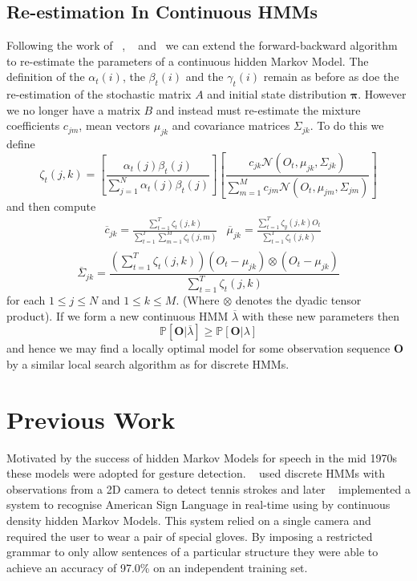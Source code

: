 \subsection{Re-estimation In Continuous HMMs}
Following the work of ~\citet{liporace1982maximum}, ~\citet{juang1985maximum} and~\citet{ juang1986maximum} we can extend the forward-backward algorithm to re-estimate the parameters of a continuous hidden Markov Model. The definition of the $\alpha_t(i)$, the $\beta_t(i)$ and the $\gamma_t(i)$ remain as before as doe the re-estimation of the stochastic matrix $A$ and initial state distribution $\bm{\pi}$. However we no longer have a matrix $B$ and instead must re-estimate the mixture coefficients $c_{jm}$, mean vectors $\mu_{jk}$ and covariance matrices $\Sigma_{jk}$. To do this we define
\begin{equation*}
\zeta_t(j,k) = \left[ \frac{\alpha_t(j)\beta_t(j)}{\sum_{j=1}^N \alpha_t(j)\beta_t(j)} \right]\left[ \frac{c_{jk}\mathcal{N}(O_t, \mu_{jk}, \Sigma_{jk})}{\sum_{m=1}^M c_{jm}\mathcal{N}(O_t, \mu_{jm},\Sigma_{jm})} \right]
\end{equation*}
and then compute
\begin{align*}
&\overline{c}_{jk} = \frac{\sum_{t=1}^T \zeta_t(j,k)}{\sum_{t=1}^T \sum_{m=1}^M \zeta_t(j,m)} 
&\overline{\mu}_{jk} = \frac{\sum_{t=1}^T \zeta_y(j,k)O_t}{\sum_{t=1}^T \zeta_t(j,k)} \\
\end{align*}
\begin{equation*}
\overline{\Sigma}_{jk} = \frac{\left(\sum_{t=1}^T \zeta_t(j,k)\right)(O_t - \mu_{jk})\otimes(O_t - \mu_{jk})}{\sum_{t=1}^T \zeta_t(j,k)}
\end{equation*}
for each $1 \leq j \leq N$ and $1 \leq k \leq M$. (Where $\otimes$ denotes the dyadic tensor product).
If we form a new continuous HMM $\overline{\lambda}$ with these new parameters then 
\begin{equation*}
\mathbb{P}[\bm{O}|\overline{\lambda}] \geq \mathbb{P}[\bm{O}|\lambda] 
\end{equation*}
and hence we may find a locally optimal model for some observation sequence $\bm{O}$ by a similar local search algorithm as for discrete HMMs.

\section{Previous Work}
Motivated by the success of hidden Markov Models for speech in the mid 1970s \citep{baker1975dragon, jelinek1975design} these models were adopted for gesture detection. ~\citet{yamato1992recognizing} used discrete HMMs with observations from a 2D camera to detect tennis strokes and later ~\citet{starner1995real} implemented a system to recognise American Sign Language in real-time using by continuous density hidden Markov Models. This system relied on a single camera and required the user to wear a pair of special gloves. By imposing a restricted grammar to only allow sentences of a particular structure they were able to achieve an accuracy of 97.0\% on an independent training set. 

